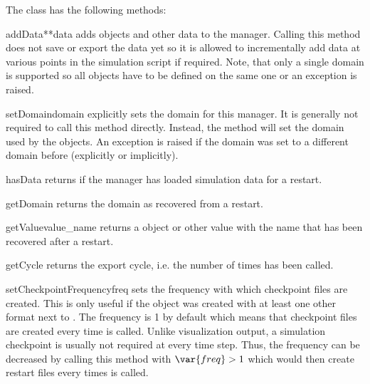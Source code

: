 \noindent The  class has the following methods:
\begin{methoddesc}[DataManager]{addData}{**data}
    adds \Data objects and other data to the manager. Calling this method does
    not save or export the data yet so it is allowed to incrementally add data
    at various points in the simulation script if required.
    Note, that only a single domain is supported so all \Data objects have to
    be defined on the same one or an exception is raised.
\end{methoddesc}

\begin{methoddesc}[DataManager]{setDomain}{domain}
    explicitly sets the domain for this manager.
    It is generally not required to call this method directly.
    Instead, the  method will set the domain used by the \Data
    objects.
    An exception is raised if the domain was set to a different domain before
    (explicitly or implicitly).
\end{methoddesc}

\begin{methoddesc}[DataManager]{hasData}{}
    returns \True if the manager has loaded simulation data for a restart.
\end{methoddesc}

\begin{methoddesc}[DataManager]{getDomain}{}
    returns the domain as recovered from a restart.
\end{methoddesc}

\begin{methoddesc}[DataManager]{getValue}{value_name}
    returns a \Data object or other value with the name  that
    has been recovered after a restart.
\end{methoddesc}

\begin{methoddesc}[DataManager]{getCycle}{}
    returns the export cycle, i.e. the number of times  has been
    called.
\end{methoddesc}

\begin{methoddesc}[DataManager]{setCheckpointFrequency}{freq}
    sets the frequency with which checkpoint files are created. This is only
    useful if the  object was created with at least one other
    format next to . The frequency is 1 by default which means
    that checkpoint files are created every time  is called.
    Unlike visualization output, a simulation checkpoint is usually not
    required at every time step. Thus, the frequency can be decreased by
    calling this method with $\var{freq}>1$ which would then create restart
    files every  times  is called.
\end{methoddesc}

